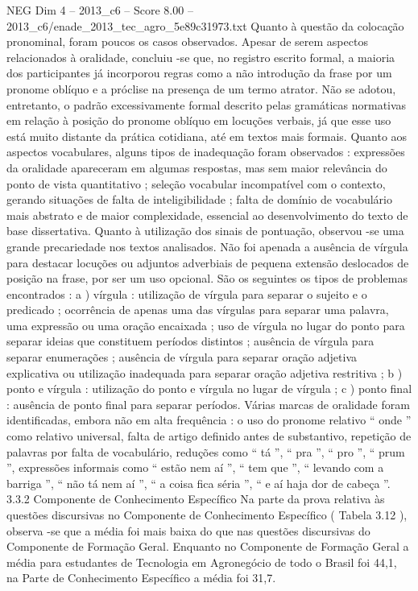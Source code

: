 \begin{textsample}{NEG Dim 4 – 2013\_c6 – Score 8.00 – 2013\_c6/enade\_2013\_tec\_agro\_5e89c31973.txt}
Quanto à questão da colocação pronominal, foram poucos os casos observados.
Apesar de serem aspectos relacionados à oralidade, concluiu -se que, no registro escrito formal, a maioria dos participantes já incorporou regras como a não introdução da frase por um pronome oblíquo e a próclise na presença de um termo atrator.
Não se adotou, entretanto, o padrão excessivamente formal descrito pelas gramáticas normativas em relação à posição do pronome oblíquo em locuções verbais, já que esse uso está muito distante da prática cotidiana, até em textos mais formais.
Quanto aos aspectos vocabulares, alguns tipos de inadequação foram observados : expressões da oralidade apareceram em algumas respostas, mas sem maior relevância do ponto de vista quantitativo ; seleção vocabular incompatível com o contexto, gerando situações de falta de inteligibilidade ; falta de domínio de vocabulário mais abstrato e de maior complexidade, essencial ao desenvolvimento do texto de base dissertativa.
Quanto à utilização dos sinais de pontuação, observou -se uma grande precariedade nos textos analisados.
Não foi apenada a ausência de vírgula para destacar locuções ou adjuntos adverbiais de pequena extensão deslocados de posição na frase, por ser um uso opcional.
São os seguintes os tipos de problemas encontrados : a ) vírgula : utilização de vírgula para separar o sujeito e o predicado ; ocorrência de apenas uma das vírgulas para separar uma palavra, uma expressão ou uma oração encaixada ; uso de vírgula no lugar do ponto para separar ideias que constituem períodos distintos ; ausência de vírgula para separar enumerações ; ausência de vírgula para separar oração adjetiva explicativa ou utilização inadequada para separar oração adjetiva restritiva ; b ) ponto e vírgula : utilização do ponto e vírgula no lugar de vírgula ; c ) ponto final : ausência de ponto final para separar períodos.
Várias marcas de oralidade foram identificadas, embora não em alta frequência : o uso do pronome relativo “ onde ” como relativo universal, falta de artigo definido antes de substantivo, repetição de palavras por falta de vocabulário, reduções como “ tá ”, “ pra ”, “ pro ”, “ prum ”, expressões informais como “ estão nem aí ”, “ tem que ”, “ levando com a barriga ”, “ não tá nem aí ”, “ a coisa fica séria ”, “ e aí haja dor de cabeça ”. 3.3.2 Componente de Conhecimento Específico Na parte da prova relativa às questões discursivas no Componente de Conhecimento Específico ( Tabela 3.12 ), observa -se que a média foi mais baixa do que nas questões discursivas do Componente de Formação Geral.
Enquanto no Componente de Formação Geral a média para estudantes de Tecnologia em Agronegócio de todo o Brasil foi 44,1, na Parte de Conhecimento Específico a média foi 31,7.

\end{textsample}
